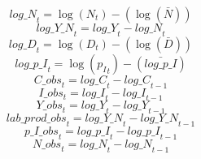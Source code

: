 \begin{dmath}
{log\_N}_{t}=\log\left({{N}}_{t}\right)-(\log\left(\bar{{N}}\right))
\end{dmath}
\begin{dmath}
{log\_Y\_N}_{t}={log\_Y}_{t}-{log\_N}_{t}
\end{dmath}
\begin{dmath}
{log\_D}_{t}=\log\left({{D}}_{t}\right)-(\log\left(\bar{{D}}\right))
\end{dmath}
\begin{dmath}
{log\_p\_I}_{t}=\log\left({{p_I}}_{t}\right)-(\bar{log\_p\_I})
\end{dmath}
\begin{dmath}
{C\_obs}_{t}={log\_C}_{t}-{log\_C}_{t-1}
\end{dmath}
\begin{dmath}
{I\_obs}_{t}={log\_I}_{t}-{log\_I}_{t-1}
\end{dmath}
\begin{dmath}
{Y\_obs}_{t}={log\_Y}_{t}-{log\_Y}_{t-1}
\end{dmath}
\begin{dmath}
{lab\_prod\_obs}_{t}={log\_Y\_N}_{t}-{log\_Y\_N}_{t-1}
\end{dmath}
\begin{dmath}
{p\_I\_obs}_{t}={log\_p\_I}_{t}-{log\_p\_I}_{t-1}
\end{dmath}
\begin{dmath}
{N\_obs}_{t}={log\_N}_{t}-{log\_N}_{t-1}
\end{dmath}
